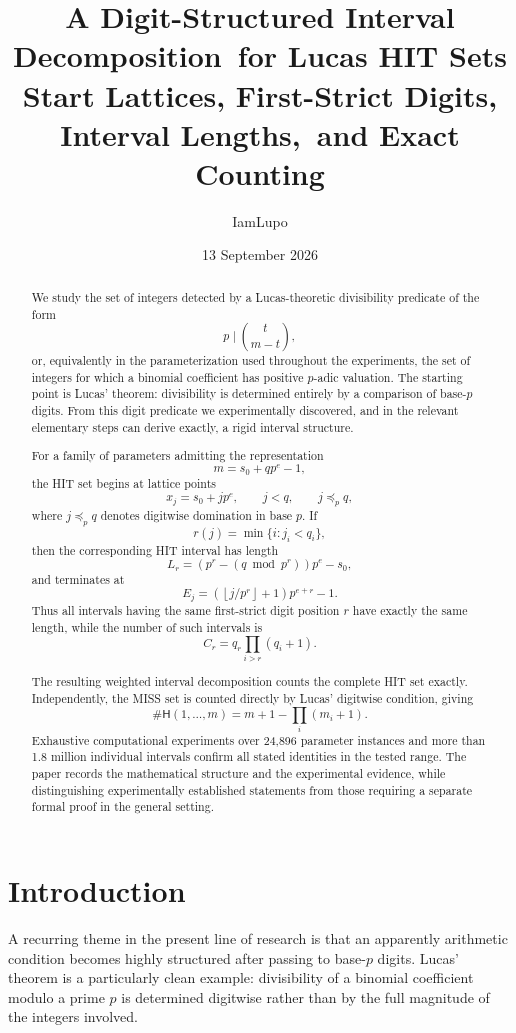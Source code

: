 \documentclass[11pt,a4paper]{article}
\title{\textbf{A Digit-Structured Interval Decomposition\ for Lucas HIT Sets}\\
\large Start Lattices, First-Strict Digits, Interval Lengths,\ and Exact Counting}
\author{IamLupo}
\date{13 September 2026}
\theoremstyle{definition}
\theoremstyle{remark}
\newcommand{\hit}{\mathsf{H}}
\begin{document}
\maketitle

\begin{abstract}
We study the set of integers detected by a Lucas-theoretic divisibility predicate of the form
\[
 p \mid \binom{t}{m-t},
\]
or, equivalently in the parameterization used throughout the experiments, the set of integers for which a binomial coefficient has positive $p$-adic valuation.  The starting point is Lucas' theorem: divisibility is determined entirely by a comparison of base-$p$ digits.  From this digit predicate we experimentally discovered, and in the relevant elementary steps can derive exactly, a rigid interval structure.

For a family of parameters admitting the representation
\[
 m=s_0+q p^e-1,
\]
the HIT set begins at lattice points
\[
 x_j=s_0+jp^e,
\qquad
j<q,\qquad j\preceq_p q,
\]
where $j\preceq_p q$ denotes digitwise domination in base $p$.  If
\[
 r(j)=\min\{i:j_i<q_i\},
\]
then the corresponding HIT interval has length
\[
 L_{r}=
 \left(p^r-(q\bmod p^r)\right)p^e-s_0,
\]
and terminates at
\[
 E_j=
 \left(\left\lfloor j/p^r\right\rfloor+1\right)p^{e+r}-1.
\]
Thus all intervals having the same first-strict digit position $r$ have exactly the same length, while the number of such intervals is
\[
 C_r=q_r\prod_{i>r}(q_i+1).
\]

The resulting weighted interval decomposition counts the complete HIT set exactly. Independently, the MISS set is counted directly by Lucas' digitwise condition, giving
\[
 \#\hit(1,\dots,m)
 =m+1-\prod_i(m_i+1).
\]
Exhaustive computational experiments over 24,896 parameter instances and more than 1.8 million individual intervals confirm all stated identities in the tested range. The paper records the mathematical structure and the experimental evidence, while distinguishing experimentally established statements from those requiring a separate formal proof in the general setting.
\end{abstract}

\section{Introduction}

A recurring theme in the present line of research is that an apparently arithmetic condition becomes highly structured after passing to base-$p$ digits.  Lucas' theorem is a particularly clean example: divisibility of a binomial coefficient modulo a prime $p$ is determined digitwise rather than by the full magnitude of the integers involved.
\end{document}
